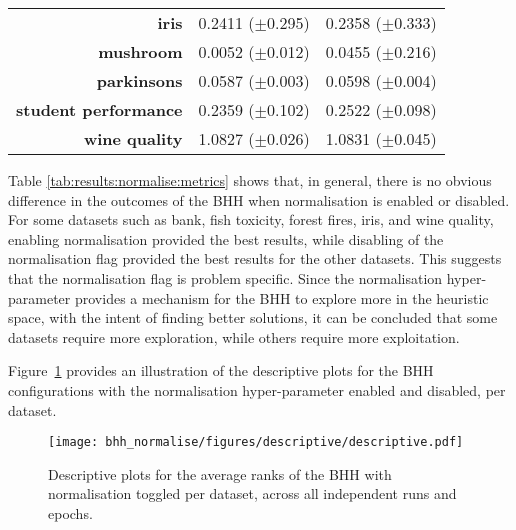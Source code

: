 \begin{table}[htb]
{\begin{tabular}{r|cc}
			\textbf{iris}                & \cellcolor[rgb]{ .973,  .412,  .42}0.2411 ($\pm$0.295)         & \cellcolor[rgb]{ .388,  .745,  .482}0.2358 ($\pm$0.333) \\
			\textbf{mushroom}            & \cellcolor[rgb]{ .388,  .745,  .482}0.0052 ($\pm$0.012)        & \cellcolor[rgb]{ .973,  .412,  .42}0.0455 ($\pm$0.216)  \\
			\textbf{parkinsons}          & \cellcolor[rgb]{ .388,  .745,  .482}0.0587 ($\pm$0.003)        & \cellcolor[rgb]{ .973,  .412,  .42}0.0598 ($\pm$0.004)  \\
			\textbf{student performance} & \cellcolor[rgb]{ .388,  .745,  .482}0.2359 ($\pm$0.102)        & \cellcolor[rgb]{ .973,  .412,  .42}0.2522 ($\pm$0.098)  \\
			\textbf{wine quality}        & \cellcolor[rgb]{ .388,  .745,  .482}1.0827 ($\pm$0.026)        & \cellcolor[rgb]{ .973,  .412,  .42}1.0831 ($\pm$0.045)  \\
		\end{tabular}%
	}
\end{table}%

Table \ref{tab:results:normalise:metrics} shows that, in general, there is no obvious difference in the outcomes of the \acs{BHH} when normalisation is enabled or disabled. For some datasets such as bank, fish toxicity, forest fires, iris, and wine quality, enabling normalisation provided the best results, while disabling of the normalisation flag provided the best results for the other datasets. This suggests that the normalisation flag is problem specific. Since the normalisation hyper-parameter provides a mechanism for the \acs{BHH} to explore more in the heuristic space, with the intent of finding better solutions, it can be concluded that some datasets require more exploration, while others require more exploitation.

Figure~\ref{fig:results:normalise:descriptive:descriptive} provides an illustration of the descriptive plots for the \acs{BHH} configurations with the normalisation hyper-parameter enabled and disabled, per dataset.

\begin{figure}[htb]
	\centering
	\texttt{[image: bhh\_normalise/figures/descriptive/descriptive.pdf]}
	\caption{Descriptive plots for the average ranks of the \acs{BHH} with normalisation toggled per dataset, across all independent runs and epochs.}
	\label{fig:results:normalise:descriptive:descriptive}
\end{figure}

